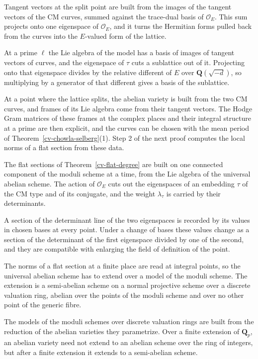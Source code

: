 Tangent vectors at the split point are built from the images of the tangent vectors of the CM curves,
summed against the trace-dual basis of $\mathcal O_E$. This sum projects onto one eigenspace of
$\mathcal O_E$, and it turns the Hermitian forms pulled back from the curves into the $E$-valued form of
the lattice.

At a prime $\ell$ the Lie algebra of the model has a basis of images of tangent vectors of curves, and
the eigenspace of $\tau$ cuts a sublattice out of it. Projecting onto that eigenspace divides by the
relative different of $E$ over $\mathbf Q(\sqrt{-d})$, so multiplying by a generator of that different
gives a basis of the sublattice.

At a point where the lattice splits, the abelian variety is built from the two CM curves, and frames
of its Lie algebra come from their tangent vectors. The Hodge Gram matrices of these frames at the
complex places and their integral structure at a prime are then explicit, and the curves can be
chosen with the mean period of Theorem~\ref{cv-chowla-selberg}(1). Step 2 of the next proof computes
the local norms of a flat section from these data.

The flat sections of Theorem~\ref{cv-flat-degree} are built on one connected component of the moduli
scheme at a time, from the Lie algebra of the universal abelian scheme. The action of
$\mathcal O_E$ cuts out the eigenspaces of an embedding $\tau$ of the CM type and of its conjugate,
and the weight $\lambda_\tau$ is carried by their determinants.

A section of the determinant line of the two eigenspaces is recorded by its values in chosen bases at
every point. Under a change of bases these values change as a section of the determinant of the first
eigenspace divided by one of the second, and they are compatible with enlarging the field of
definition of the point.

The norms of a flat section at a finite place are read at integral points, so the universal abelian
scheme has to extend over a model of the moduli scheme. The extension is a semi-abelian scheme on a
normal projective scheme over a discrete valuation ring, abelian over the points of the moduli scheme
and over no other point of the generic fibre.

The models of the moduli schemes over discrete valuation rings are built from the reduction of the
abelian varieties they parametrize. Over a finite extension of $\mathbf Q_p$, an abelian variety
need not extend to an abelian scheme over the ring of integers, but after a finite extension it
extends to a semi-abelian scheme.

